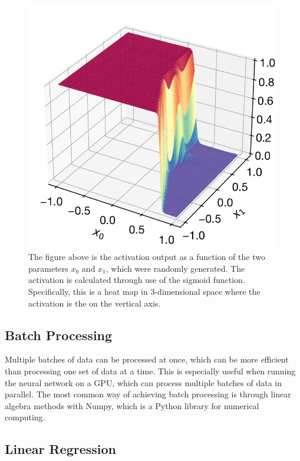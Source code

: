 \begin{figure}[H]
\centering
\includegraphics[scale=0.65]{../figures/3D_activation.pdf}
\caption{The figure above is the activation output as a function of the two parameters $x_0$ and $x_1$, which were randomly generated. The activation is calculated through use of the sigmoid function. Specifically, this is a heat map in 3-dimensional space where the activation is the on the vertical axis.}
\end{figure}

\subsection{Batch Processing}

Multiple batches of data can be processed at once, which can be more efficient than processing one set of data at a time. This is especially useful when running the neural network on a GPU, which can process multiple batches of data in parallel. The most common way of achieving batch processing is through linear algebra methods with Numpy\cite{harris2020array}, which is a Python library for numerical computing.

\subsection{Linear Regression}
